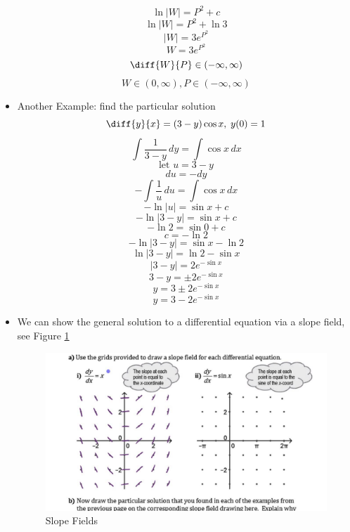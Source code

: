 \documentclass{article}
\newcommand{\letv}[1]{\text{let }#1 = }
\begin{document}
\begin{itemize}
        \[\ln|W| = P^2+c\]
        \[\ln|W| = P^2+\ln3\]
        \[|W| = 3e^{P^2}\]
        \[W = 3e^{P^2}\]
        \[\diff{W}{P}\in(-\infty,\infty)\]
        \[W\in(0,\infty), P\in(-\infty,\infty)\]
    \item Another Example: find the particular solution
        \[\diff{y}{x} = (3-y)\cos x,\;y(0) = 1\]
        \[\int\frac{1}{3-y}\,dy = \int\cos x\,dx\]
        \[\letv{u}3-y\]
        \[du = -dy\]
        \[-\int\frac{1}{u}\,du = \int\cos x\,dx\]
        \[-\ln|u| = \sin x+c\]
        \[-\ln|3-y| = \sin x+c\]
        \[-\ln2 = \sin0+c\]
        \[c = -\ln2\]
        \[-\ln|3-y| = \sin x-\ln2\]
        \[\ln|3-y| = \ln2-\sin x\]
        \[|3-y| = 2e^{-\sin x}\]
        \[3-y = \pm2e^{-\sin x}\]
        \[y = 3\pm2e^{-\sin x}\]
        \[y = 3-2e^{-\sin x}\]
    \item We can show the general solution to a differential equation via a slope field, see Figure \ref{fig:slopeFields}

    \begin{figure}[h]
        \centering
        \includegraphics[width=0.5\linewidth]{images/Slope Fields.jpg}
        \caption{Slope Fields}
        \label{fig:slopeFields}
    \end{figure}
\end{itemize}
\end{document}
